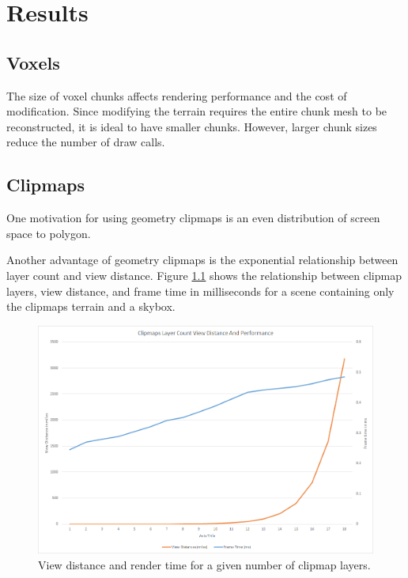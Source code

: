 \chapter{Results}


\section{Voxels}

The size of voxel chunks affects rendering performance and the cost of modification.
Since modifying the terrain requires the entire chunk mesh to be reconstructed, it is ideal to have smaller chunks.
However, larger chunk sizes reduce the number of draw calls.



\section{Clipmaps}

One motivation for using geometry clipmaps is an even distribution of screen space to polygon.

Another advantage of geometry clipmaps is the exponential relationship between layer count and view distance.
Figure \ref{fig:clipmaps_plot_1} shows the relationship between clipmap layers, view distance, and frame time in milliseconds for a scene containing only the clipmaps terrain and a skybox.

\begin{figure}
	\centering
		\includegraphics[width=1.0\textwidth]{figures/clipmaps_plot_1.png}
	\caption{
		View distance and render time for a given number of clipmap layers.
	}
	\label{fig:clipmaps_plot_1}
\end{figure}

